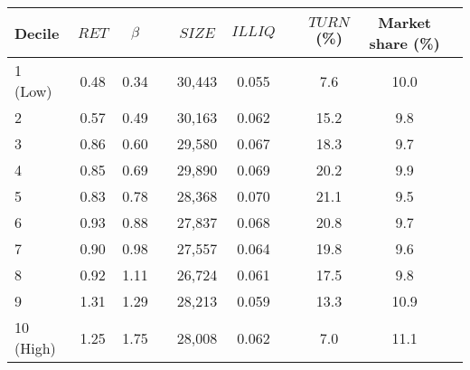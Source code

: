 \begin{tabular}{@{}lccccccccc@{}}
	\toprule
	Decile & $\textit{RET}$ & $\beta$ && $\textit{SIZE}$ & $\textit{ILLIQ}$ && $\textit{TURN}$ (\%) & Market share (\%) \\ \midrule
1 (Low) & 0.48 & 0.34 && 30,443 & 0.055 && 7.6 & 10.0 \\
2       & 0.57 & 0.49 && 30,163 & 0.062 && 15.2 & 9.8 \\
3       & 0.86 & 0.60 && 29,580 & 0.067 && 18.3 & 9.7 \\
4       & 0.85 & 0.69 && 29,890 & 0.069 && 20.2 & 9.9 \\
5       & 0.83 & 0.78 && 28,368 & 0.070 && 21.1 & 9.5 \\
6       & 0.93 & 0.88 && 27,837 & 0.068 && 20.8 & 9.7 \\
7       & 0.90 & 0.98 && 27,557 & 0.064 && 19.8 & 9.6 \\
8       & 0.92 & 1.11 && 26,724 & 0.061 && 17.5 & 9.8 \\
9       & 1.31 & 1.29 && 28,213 & 0.059 && 13.3 & 10.9 \\
10 (High) & 1.25 & 1.75 && 28,008 & 0.062 && 7.0 & 11.1 \\
	\bottomrule
\end{tabular}
